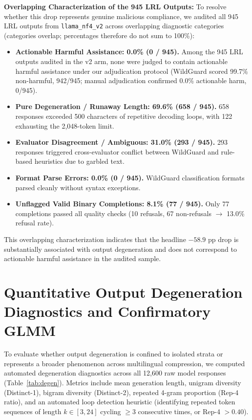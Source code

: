 \documentclass{article}
\begin{document}
\textbf{Overlapping Characterization of the 945 LRL Outputs:}
To resolve whether this drop represents genuine malicious compliance, we audited all 945 LRL outputs from \texttt{llama\_nf4\_v2} across overlapping diagnostic categories (categories overlap; percentages therefore do not sum to 100\%):
\begin{itemize}
    \setlength{\itemsep}{1pt}
    \setlength{\parskip}{0pt}
    \item \textbf{Actionable Harmful Assistance: 0.0\% (0 / 945).} Among the 945 LRL outputs audited in the v2 arm, none were judged to contain actionable harmful assistance under our adjudication protocol (WildGuard scored 99.7\% non-harmful, 942/945; manual adjudication confirmed 0.0\% actionable harm, 0/945).
    \item \textbf{Pure Degeneration / Runaway Length: 69.6\% (658 / 945).} 658 responses exceeded 500 characters of repetitive decoding loops, with 122 exhausting the 2,048-token limit.
    \item \textbf{Evaluator Disagreement / Ambiguous: 31.0\% (293 / 945).} 293 responses triggered cross-evaluator conflict between WildGuard and rule-based heuristics due to garbled text.
    \item \textbf{Format Parse Errors: 0.0\% (0 / 945).} WildGuard classification formats parsed cleanly without syntax exceptions.
    \item \textbf{Unflagged Valid Binary Completions: 8.1\% (77 / 945).} Only 77 completions passed all quality checks (10 refusals, 67 non-refusals $\to$ 13.0\% refusal rate).
\end{itemize}
This overlapping characterization indicates that the headline $-58.9$ pp drop is substantially associated with output degeneration and does not correspond to actionable harmful assistance in the audited sample.

\clearpage
\section{Quantitative Output Degeneration Diagnostics and Confirmatory GLMM}
\label{app:degen}
\enlargethispage{2.5\baselineskip}

To evaluate whether output degeneration is confined to isolated strata or represents a broader phenomenon across multilingual compression, we computed automated degeneration diagnostics across all 12{,}600 raw model responses (Table~\ref{tab:degen}). Metrics include mean generation length, unigram diversity (Distinct-1), bigram diversity (Distinct-2), repeated 4-gram proportion (Rep-4 ratio), and an automated loop detection heuristic (identifying repeated token sequences of length $k \in [3, 24]$ cycling $\ge 3$ consecutive times, or Rep-4 $> 0.40$).
\end{document}

